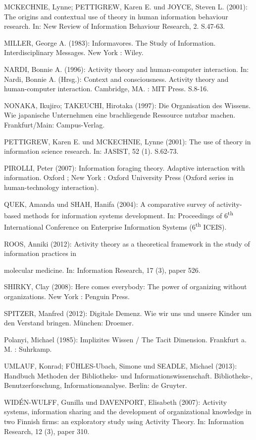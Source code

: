 \documentclass[a4paper,
fontsize=11pt,
oneside,
numbers=noperiodatend,
parskip=half-,
bibliography=totoc,
final
]{scrartcl}
\begin{document}
MCKECHNIE, Lynne; PETTIGREW, Karen E. und JOYCE, Steven L. (2001): The
origins and contextual use of theory in human information behaviour
research. In: New Review of Information Behaviour Research, 2. S.47-63.

MILLER, George A. (1983): Informavores. The Study of Information.
Interdisciplinary Messages. New York : Wiley.

NARDI, Bonnie A. (1996): Activity theory and human-computer interaction.
In: Nardi, Bonnie A. (Hrsg.): Context and consciousness. Activity theory
and human-computer interaction. Cambridge, MA. : MIT Press. S.8-16.

NONAKA, Ikujiro; TAKEUCHI, Hirotaka (1997): Die Organisation des
Wissens. Wie japanische Unternehmen eine brachliegende Ressource nutzbar
machen. Frankfurt/Main: Campus-Verlag.

PETTIGREW, Karen E. und MCKECHNIE, Lynne (2001): The use of theory in
information science research. In: JASIST, 52 (1). S.62-73.

PIROLLI, Peter (2007): Information foraging theory. Adaptive interaction
with information. Oxford ; New York : Oxford University Press (Oxford
series in human-technology interaction).

QUEK, Amanda und SHAH, Hanifa (2004): A comparative survey of
activity-based methods for information systems development. In:
Proceedings of 6\textsuperscript{th} International Conference on
Enterprise Information Systems (6\textsuperscript{th} ICEIS).

ROOS, Anniki (2012): Activity theory as a theoretical framework in the
study of information practices in

molecular medicine. In: Information Research, 17 (3), paper 526.

SHIRKY, Clay (2008): Here comes everybody: The power of organizing
without organizations. New York : Penguin Press.

SPITZER, Manfred (2012): Digitale Demenz. Wie wir uns und unsere Kinder
um den Verstand bringen. München: Droemer.

Polanyi, Michael (1985): Implizites Wissen / The Tacit Dimension.
Frankfurt a. M. : Suhrkamp.

UMLAUF, Konrad; FÜHLES-Ubach, Simone und SEADLE, Michael (2013):
Handbuch Methoden der Bibliotheks- und Informationswissenschaft.
Bibliotheks-, Benutzerforschung, Informationsanalyse. Berlin: de
Gruyter.

WIDÉN-WULFF, Gunilla und DAVENPORT, Elisabeth (2007): Activity systems,
information sharing and the development of organizational knowledge in
two Finnish firms: an exploratory study using Activity Theory. In:
Information Research, 12 (3), paper 310.
\end{document}
